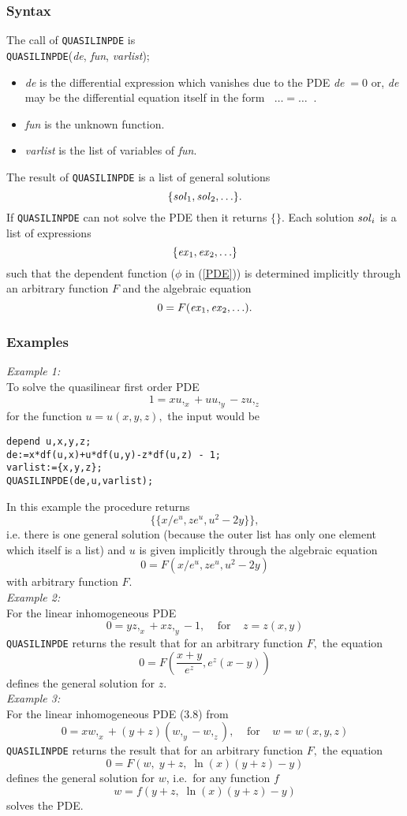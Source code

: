 \subsubsection{Syntax}
The call of {\tt QUASILINPDE} is \\
{\tt QUASILINPDE}({\it de}, {\it fun}, {\it varlist});
\begin{itemize}
\item
{\it de} is the differential expression which vanishes due to the PDE
{\it de}$\; = 0$ or, {\it de} may be the differential equation itself in the
form $\;\;\ldots = \ldots\;\;$.
\item
{\it fun} is the unknown function.
\item
{\it varlist} is the list of variables of {\it fun}.
\end{itemize}
The result of {\tt QUASILINPDE} is a list of general solutions
\[      \{{\it sol}_1, {\it sol}_2, \ldots \}.  \]
If {\tt QUASILINPDE} can not solve the PDE then it returns $\{\}$.
Each solution ${\it sol}_i$ is a list of expressions
\[      \{{\it ex}_1, {\it ex}_2, \ldots \}  \]
such that the dependent function ($\phi$ in (\ref{PDE})) is determined
implicitly through an arbitrary function $F$ and the algebraic
equation \[ 0 = F({\it ex}_1, {\it ex}_2, \ldots). \]
\subsubsection{Examples}
{\em Example 1:}\\
To solve the quasilinear first order PDE \[1 = xu,_x + uu,_y - zu,_z\]
for the function $u = u(x,y,z),$ the input would be
\small \begin{verbatim}
depend u,x,y,z;
de:=x*df(u,x)+u*df(u,y)-z*df(u,z) - 1;
varlist:={x,y,z};
QUASILINPDE(de,u,varlist);
\end{verbatim} \normalsize
In this example the procedure returns
\[\{ \{ x/e^u, ze^u, u^2 - 2y \} \},\] 
i.e. there is one general solution (because the outer list has only one
element which itself is a list) and $u$ is given implicitly through 
the algebraic equation
\[ 0 = F(x/e^u, ze^u, u^2 - 2y)\] 
with arbitrary function $F.$ \\
{\em Example 2:}\\
For the linear inhomogeneous PDE
\[ 0 = y z,_x + x z,_y - 1, \;\;\;\;\mbox{for}\;\;\;\;z=z(x,y)\]
{\tt QUASILINPDE} returns the result that for an arbitrary function $F,$ the
equation
\[ 0 = F\left(\frac{x+y}{e^z},e^z(x-y)\right) \]
defines the general solution for $z$. \\
{\em Example 3:}\\
For the linear inhomogeneous PDE (3.8) from \cite{KamkePDE}
\[ 0 = x w,_x + (y+z)(w,_y - w,_z), \;\;\;\;\mbox{for}\;\;\;\;w=w(x,y,z)\]
{\tt QUASILINPDE} returns the result 
that for an arbitrary function $F,$ the equation
\[ 0 = F\left(w, \;y+z, \;\ln(x)(y+z)-y\right) \]
defines the general solution for $w$, i.e.\ for any function $f$
\[ w = f\left(y+z, \;\ln(x)(y+z)-y\right) \]
solves the PDE.

